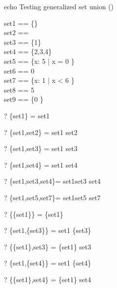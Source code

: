 echo     Testing generalized set union (\bigcup)
\begin{zed}
set1 == \{\} \\                 %
set2 == \emptyset \\            %
set3 == \{1\} \\                %
set4 == \{2,3,4\} \\            %
set5 == \{x: 5  | x  = 0 \} \\
set6 == 0   \\
set7 == \{x: 1  | x < 6 \} \\
set8 == 5  \\
set9 == \{0 \} \\
\end{zed}

\begin{zed}\vdash? \bigcup \{set1\}        = set1 \end{zed}
\begin{zed}\vdash? \bigcup \{set1,set2\}   = set1 \cup set2 \end{zed}
\begin{zed}\vdash? \bigcup \{set1,set3\}   = set1 \cup set3 \end{zed}
\begin{zed}\vdash? \bigcup \{set1,set4\}   = set1 \cup set4 \end{zed}
\begin{zed}\vdash? \bigcup\{set1,set3,set4\}= set1\cup set3 \cup set4\end{zed}
\begin{zed}\vdash? \bigcup\{set1,set5,set7\}= set1\cup set5 \cup set7\end{zed}
\begin{zed}\vdash? \bigcup \{\{set1\}\}      = \{set1\} \end{zed}
\begin{zed}\vdash? \bigcup \{set1,\{set3\}\} = set1 \cup \{set3\} \end{zed}
\begin{zed}\vdash? \bigcup \{\{set1\},set3\} = \{set1\} \cup set3 \end{zed}
\begin{zed}\vdash? \bigcup \{set1,\{set4\}\} = set1 \cup \{set4\} \end{zed}
\begin{zed}\vdash? \bigcup \{\{set1\},set4\} = \{set1\} \cup set4 \end{zed}

